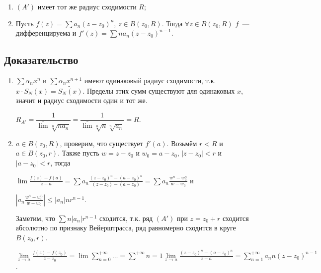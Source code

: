 \documentclass{article}
\begin{document}
        \begin{enumerate}
        
            \item $(A')$ имеет тот же радиус сходимости $R$;
            
            \item Пусть $f(z) = \sum a_n (z - z_0)^n$, $z \in B(z_0, R)$. Тогда $\forall z \in B(z_0, R)$ $f$~--- дифференцируема и $f'(z) = \sum n a_n (z - z_0)^{n - 1}$.
            
        \end{enumerate}
        
        \subsection{Доказательство}
        
            \begin{enumerate}
            
                \item $\sum \alpha_n x^n$ и $\sum \alpha_n x^{n + 1}$ имеют одинаковый радиус сходимости, т.к. $x \cdot S_N(x) = \widetilde{S_N(x)}$. Пределы этих сумм существуют для одинаковых $x$, значит и радиус сходимости один и тот же.
                
                    $R_{A'} = \dfrac{1}{\overline{\lim}\sqrt[n]{n a_n}} = \dfrac{1}{\overline{\lim}\sqrt[n]{n}\sqrt[n]{a_n}} = R$.
                    
                \item $a \in B(z_0, R)$, проверим, что существует $f'(a)$. Возьмём $r < R$ и $a \in B(z_0, r)$. Также пусть $w = z - z_0$ и $w_0 = a - z_0$, $| z - z_0 | < r$ и $| a - z_0 | < r$, тогда
                
                    $\lim \frac{f(z) - f(a)}{z - a} = \sum a_n \frac{(z - z_0)^n - (a - z_0)^n}{(z - z_0) - (a - z_0)} = \sum a_n \frac{w^n - w_0^n}{w - w_0}$ и 
                    
                    $\left| a_n \frac{w^n - w_0^n}{w - w_0} \right| \leq | a_n | n r^{n - 1}$.
                    
                    Заметим, что $\sum n | a_n | r^{n - 1}$ сходится, т.к. ряд $(A')$ при $z = z_0 + r$ сходится абсолютно по признаку Вейерштрасса, ряд равномерно сходится в круге $B(z_0, r)$.
                    
                    $\lim\limits_{z \rightarrow a} \frac{f(z) - f(z_0)}{z - z_0} = \lim \sum\limits^{+\infty}_{n = 0} \ldots = \sum\limits^{+\infty}{n = 1} \lim\limits_{z \rightarrow a} \frac{(z - z_0)^n - (a - z_0)^n}{z - a} = \sum\limits^{+\infty}_{n = 1} a_n n (z - z_0)^{n - 1}$.
                    
            \end{enumerate}
            
\end{document}
